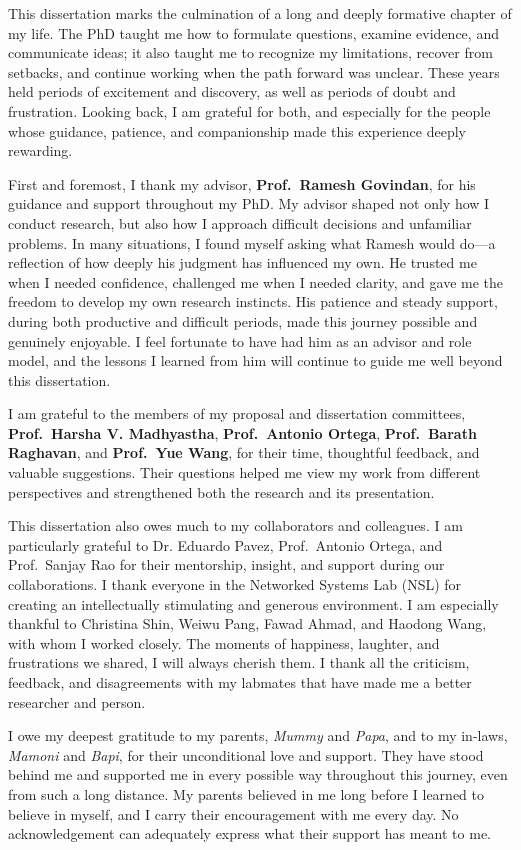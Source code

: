 This dissertation marks the culmination of a long and deeply formative chapter of my life. The PhD taught me how to formulate questions, examine evidence, and communicate ideas; it also taught me to recognize my limitations, recover from setbacks, and continue working when the path forward was unclear. These years held periods of excitement and discovery, as well as periods of doubt and frustration. Looking back, I am grateful for both, and especially for the people whose guidance, patience, and companionship made this experience deeply rewarding.

First and foremost, I thank my advisor, \textbf{Prof.~Ramesh Govindan}, for his guidance and support throughout my PhD. My advisor shaped not only how I conduct research, but also how I approach difficult decisions and unfamiliar problems. In many situations, I found myself asking what Ramesh would do---a reflection of how deeply his judgment has influenced my own. He trusted me when I needed confidence, challenged me when I needed clarity, and gave me the freedom to develop my own research instincts. His patience and steady support, during both productive and difficult periods, made this journey possible and genuinely enjoyable. I feel fortunate to have had him as an advisor and role model, and the lessons I learned from him will continue to guide me well beyond this dissertation.

I am grateful to the members of my proposal and dissertation committees, \textbf{Prof.~Harsha V. Madhyastha}, \textbf{Prof.~Antonio Ortega}, \textbf{Prof.~Barath Raghavan}, and \textbf{Prof.~Yue Wang}, for their time, thoughtful feedback, and valuable suggestions. Their questions helped me view my work from different perspectives and strengthened both the research and its presentation.

This dissertation also owes much to my collaborators and colleagues. I am particularly grateful to Dr. Eduardo Pavez, Prof.~Antonio Ortega, and Prof.~Sanjay Rao for their mentorship, insight, and support during our collaborations. I thank everyone in the Networked Systems Lab (NSL) for creating an intellectually stimulating and generous environment. I am especially thankful to Christina Shin, Weiwu Pang, Fawad Ahmad, and Haodong Wang, with whom I worked closely. The moments of happiness, laughter, and frustrations we shared, I will always cherish them. I thank all the criticism, feedback, and disagreements with my labmates that have made me a better researcher and person.

I owe my deepest gratitude to my parents, \textit{Mummy} and \textit{Papa}, and to my in-laws, \textit{Mamoni} and \textit{Bapi}, for their unconditional love and support. They have stood behind me and supported me in every possible way throughout this journey, even from such a long distance. My parents believed in me long before I learned to believe in myself, and I carry their encouragement with me every day. No acknowledgement can adequately express what their support has meant to me.

